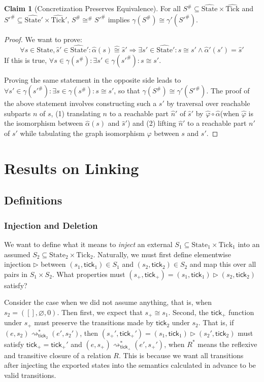 \documentclass{article}
\theoremstyle{definition}
\newtheorem{clm}{Claim}[section]
\newcommand*{\A}[1]{\widehat{#1}}
\newcommand*{\Abs}[1]{{#1}^{\#}}
\newcommand*{\State}{\text{State}}
\newcommand*{\AState}{\widehat{\text{State}}}
\newcommand*{\Tick}{\text{Tick}}
\newcommand*{\semarrow}{\rightsquigarrow}
\newcommand*{\tick}{\mathsf{tick}}
\begin{document}
\begin{clm}[Concretization Preserves Equivalence]
  For all $\Abs{S}\subseteq\AState\times\A\Tick$ and $\Abs{S'}\subseteq\AState'\times\A\Tick'$, $\Abs{S}\Abs\cong\Abs{S'}$ implies $\gamma(\Abs{S})\cong\gamma'(\Abs{S'})$.
\end{clm}
\begin{proof}
  We want to prove:
  \[\forall s\in\State,\A{s}'\in\AState':\A\alpha(s)\A\cong\A{s}'\Rightarrow\exists s'\in\AState':s\cong s'\wedge\A\alpha'(s')=\A{s}'\]
  If this is true, $\forall s\in\gamma(\Abs{s}):\exists s'\in\gamma(\Abs{s'}):s\cong s'$.

  Proving the same statement in the opposite side leads to $\forall s'\in\gamma(\Abs{s'}):\exists s\in\gamma(\Abs{s}):s\cong s'$, so that $\gamma(\Abs{S})\cong\gamma'(\Abs{S'})$.
  The proof of the above statement involves constructing such a $s'$ by traversal over reachable subparts $n$ of $s$, (1) translating $n$ to a reachable part $\A{n}'$ of $\A{s}'$ by $\A\varphi\circ\A\alpha$(when $\A\varphi$ is the isomorphism between $\A\alpha(s)$ and $\A{s}'$) and (2) lifting $\A{n}'$ to a reachable part $n'$ of $s'$ while tabulating the graph isomorphism $\varphi$ between $s$ and $s'$.
\end{proof}

\section{Results on Linking}
\subsection{Definitions}
\subsubsection{Injection and Deletion}
We want to define what it means to \emph{inject} an external $S_1\subseteq\State_1\times\Tick_1$ into an assumed $S_2\subseteq\State_2\times\Tick_2$.
Naturally, we must first define elementwise injection $\rhd$ between $(s_1,\tick_1)\in S_1$ and $(s_2,\tick_2)\in S_2$ and map this over all pairs in $S_1\times S_2$.
What properties must $(s_+,\tick_+)=(s_1,\tick_1)\rhd(s_2,\tick_2)$ satisfy?

Consider the case when we did not assume anything, that is, when $s_2=([],\varnothing,0)$.
Then first, we expect that $s_+\cong s_1$.
Second, the $\tick_+$ function under $s_+$ must preserve the transitions made by $\tick_2$ under $s_2$.
That is, if $(e,s_2)\semarrow_{\tick_2}^*(e',s_2')$, then $(s_+',\tick_+')=(s_1,\tick_1)\rhd(s_2',\tick_2)$ must satisfy
$\tick_+=\tick_+'$ and $(e,s_+)\semarrow_{\tick_+}^*(e',s_+')$, when $R^*$ means the reflexive and transitive closure of a relation $R$.
This is because we want all transitions after injecting the exported states into the semantics calculated in advance to be valid transitions.
\end{document}

